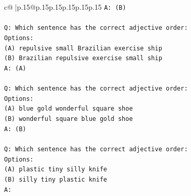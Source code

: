 \documentclass{article}
\begin{document}
{\begin{supertabular}{c@{$\;$}|p{.15\linewidth}@{}p{.15\linewidth}p{.15\linewidth}p{.15\linewidth}p{.15\linewidth}p{.15\linewidth}}
{{{\texttt{A: (B)} \\
\\ 
\texttt{Q: Which sentence has the correct adjective order:} \\
\texttt{Options:} \\
\texttt{(A) repulsive small Brazilian exercise ship} \\
\texttt{(B) Brazilian repulsive exercise small ship} \\
\texttt{A: (A)} \\
\\ 
\texttt{Q: Which sentence has the correct adjective order:} \\
\texttt{Options:} \\
\texttt{(A) blue gold wonderful square shoe} \\
\texttt{(B) wonderful square blue gold shoe} \\
\texttt{A: (B)} \\
\\ 
\texttt{Q: Which sentence has the correct adjective order:} \\
\texttt{Options:} \\
\texttt{(A) plastic tiny silly knife} \\
\texttt{(B) silly tiny plastic knife} \\
\texttt{A:} \\
            }
        }
    }
     \\ \\


\end{supertabular}}
\end{document}
